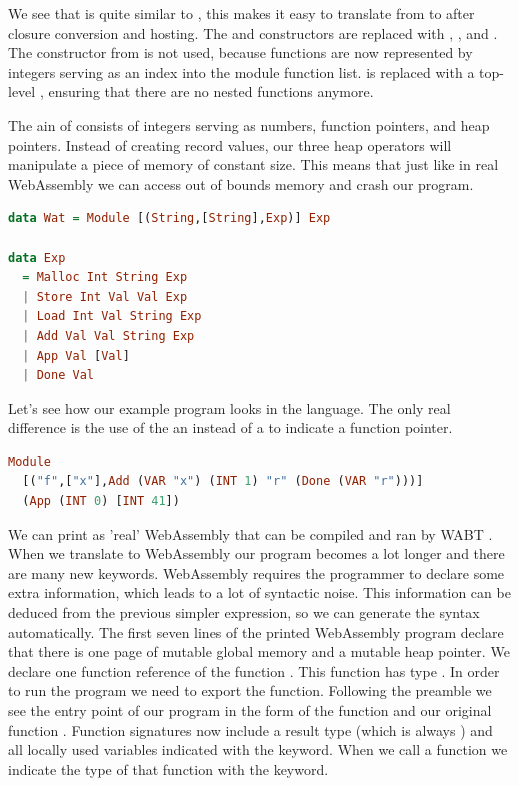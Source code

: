 {We see that  is quite similar to , this makes it easy to translate from  to  after closure conversion and hosting. The  and  constructors are replaced with , , and . The  constructor from  is not used, because functions are now represented by integers serving as an index into the module function list.  is replaced with a top-level , ensuring that there are no nested functions anymore.

The ain of  consists of integers serving as numbers, function pointers, and heap pointers. Instead of creating record values, our three heap operators will manipulate a piece of memory of constant size. This means that just like in real WebAssembly we can access out of bounds memory and crash our program.

\begin{lstlisting}[language=Haskell]
data Wat = Module [(String,[String],Exp)] Exp

data Exp
  = Malloc Int String Exp
  | Store Int Val Val Exp
  | Load Int Val String Exp
  | Add Val Val String Exp
  | App Val [Val]
  | Done Val
\end{lstlisting}

Let's see how our example program looks in the  language. The only real difference is the use of the an  instead of a  to indicate a function pointer.

\begin{lstlisting}[language=Haskell]
Module 
  [("f",["x"],Add (VAR "x") (INT 1) "r" (Done (VAR "r")))]
  (App (INT 0) [INT 41])
\end{lstlisting}

We can print  as 'real' WebAssembly that can be compiled and ran by WABT \autocite{wabt}. When we translate to WebAssembly our program becomes a lot longer and there are many new keywords. WebAssembly requires the programmer to declare some extra information, which leads to a lot of syntactic noise. This information can be deduced from the previous simpler  expression, so we can generate the syntax automatically. The first seven lines of the printed WebAssembly program declare that there is one page of mutable global memory and a mutable heap pointer. We declare one function reference of the function . This function has type . In order to run the program we need to export the  function. Following the preamble we see the entry point of our program in the form of the function  and our original function . Function signatures now include a result type (which is always ) and all locally used variables indicated with the  keyword. When we call a function we indicate the type of that function with the  keyword.

}

